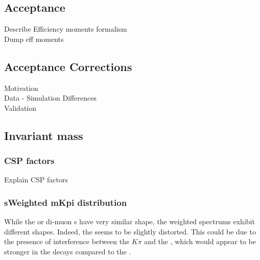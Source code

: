 




\subsection{Acceptance}
\label{Accceptance}
Describe Efficiency moments formalism\\
Dump eff moments\\

\subsection{Acceptance Corrections}
\label{Accceptance_Corrections}
Motivation\\
Data - Simulation Differences\\
Validation\\

\subsection{\Kpi Invariant mass}
\label{Kpi_Invariant_mass}

\subsubsection{CSP factors}
Explain CSP factors\\

\subsubsection{sWeighted mKpi distribution}
While the \Bs or \Bd di-muon \sPlot s have very similar shape, the \mkpi weighted spectrums exhibit different shapes. 
Indeed, the \Bs \mkpi \sPlot seems to be slightly distorted. This could be due to the presence of interference between
 the $K\pi$ \swave and the \Kstarz, which would appear to be stronger in the \Bs decays compared to the \Bd. 

